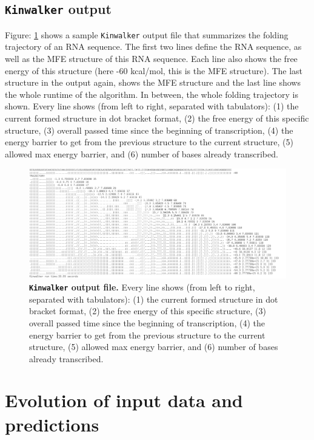 \documentclass[ twoside,openright,titlepage,numbers=noenddot,headinclude,%
                footinclude=false, cleardoublepage=empty,abstractoff, %
                BCOR=5mm,paper=a4,fontsize=11pt,%
                ngerman,american,%
                ]{scrreprt}
\begin{document}
\subsection{\texttt{Kinwalker} output}


Figure: \ref{fig:kinwalker output} shows a sample \texttt{Kinwalker} output file that summarizes the folding trajectory of an RNA sequence.
The first two lines define the RNA sequence, as well as the MFE structure of this RNA sequence. Each line also shows the free energy of this structure (here -60 kcal/mol, this is the MFE structure).
The last structure in the output again, shows the MFE structure and the last line shows the whole runtime of the algorithm.
In between, the whole folding trajectory is shown.
Every line shows (from left to right, separated with tabulators):
(1) the current formed structure in dot bracket format, (2) the free energy
of this specific structure, (3) overall passed time since the beginning of
transcription, (4) the energy barrier to get from the previous structure to
the current structure, (5) allowed max energy barrier, and (6) number of bases already transcribed.

\begin{figure}[ht] 
\centering
\includegraphics[width=1\textwidth]{./pictures/KinwalkOutput.png}
\caption{{\bf \texttt{Kinwalker} output file.}
Every line shows (from left to right, separated with tabulators):
(1) the current formed structure in dot bracket format, (2) the free energy
of this specific structure, (3) overall passed time since the beginning of
transcription, (4) the energy barrier to get from the previous structure to
the current structure, (5) allowed max energy barrier, and (6) number of bases already transcribed.
}
\label{fig:kinwalker output}
\end{figure}
\FloatBarrier


\section{Evolution of input data and predictions} \label{section:scores}
\end{document}
